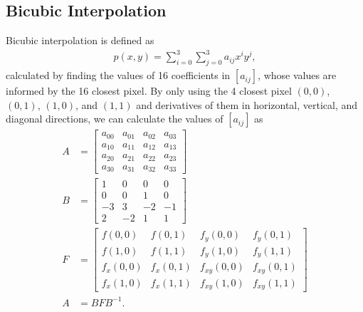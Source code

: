 \documentclass[conference]{IEEEtran}
\begin{document}
\subsection{Bicubic Interpolation}
Bicubic interpolation is defined as 
\begin{align}
	p(x, y) = \sum_{i = 0}^3\sum_{j = 0}^3a_{ij}x^iy^j,\label{BicubicDef}
\end{align}
calculated by finding the values of 16 coefficients in $[a_{ij}]$, whose values are informed by the 16 closest pixel. By only using the 4 closest pixel $(0,0)$, $(0,1)$, $(1,0)$, and $(1,1)$ and derivatives of them in horizontal, vertical, and diagonal directions, we can calculate the values of $[a_{ij}]$ as 
\begin{align}
	A &=
	\begin{bmatrix}
		a_{00} & a_{01} & a_{02} & a_{03}\\
		a_{10} & a_{11} & a_{12} & a_{13}\\
		a_{20} & a_{21} & a_{22} & a_{23}\\
		a_{30} & a_{31} & a_{32} & a_{33}
	\end{bmatrix}\\
	B &=
	\begin{bmatrix}
		1 & 0 & 0 & 0\\
		0 & 0 & 1 & 0\\
		-3 & 3 & -2 & -1\\
		2 & -2 & 1 & 1
	\end{bmatrix}\\
	F &=
	\begin{bmatrix}
		f(0,0) & f(0,1) & f_y(0,0) & f_y(0,1)\\
		f(1,0) & f(1,1) & f_y(1,0) & f_y(1,1)\\
		f_x(0,0) & f_x(0,1) & f_{xy}(0,0) & f_{xy}(0,1)\\
		f_x(1,0) & f_x(1,1) & f_{xy}(1,0) & f_{xy}(1,1)
	\end{bmatrix}\\
	A &= BFB^{-1}.\label{BicubicVal}
\end{align}
\end{document}
